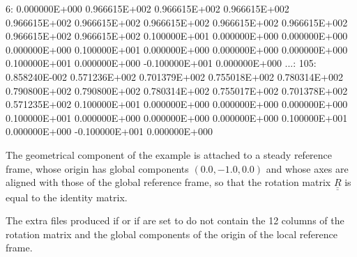 \begin{inputfile}[frame=single]
  6: 0.000000E+000  0.966615E+002  0.966615E+002  0.966615E+002  0.966615E+002
     0.966615E+002  0.966615E+002  0.966615E+002  0.966615E+002  0.966615E+002
     0.966615E+002  0.100000E+001  0.000000E+000  0.000000E+000  0.000000E+000
     0.100000E+001  0.000000E+000  0.000000E+000  0.000000E+000  0.100000E+001
     0.000000E+000 -0.100000E+001  0.000000E+000
...:
105: 0.858240E-002  0.571236E+002  0.701379E+002  0.755018E+002  0.780314E+002
     0.790800E+002  0.790800E+002  0.780314E+002  0.755017E+002  0.701378E+002
     0.571235E+002  0.100000E+001  0.000000E+000  0.000000E+000  0.000000E+000
     0.100000E+001  0.000000E+000  0.000000E+000  0.000000E+000  0.100000E+001
     0.000000E+000 -0.100000E+001  0.000000E+000
\end{inputfile}
The geometrical component of the example is attached to a steady reference frame, whose origin has global components $( 0.0, -1.0, 0.0 )$ and whose axes are aligned with those of the global reference frame, so that the rotation matrix $\underline{\underline{R}}$ is equal to the identity matrix.

The extra files produced if   or if  are set to  do not contain the 12 columns of the rotation matrix and the global components of the origin of the local reference frame.

